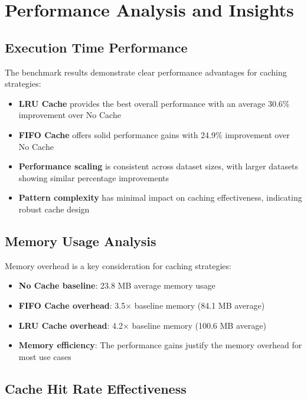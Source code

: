 \documentclass{article}
\begin{document}
\section{Performance Analysis and Insights}

\subsection{Execution Time Performance}

The benchmark results demonstrate clear performance advantages for caching strategies:

\begin{itemize}
    \item \textbf{LRU Cache} provides the best overall performance with an average 30.6\% improvement over No Cache
    \item \textbf{FIFO Cache} offers solid performance gains with 24.9\% improvement over No Cache
    \item \textbf{Performance scaling} is consistent across dataset sizes, with larger datasets showing similar percentage improvements
    \item \textbf{Pattern complexity} has minimal impact on caching effectiveness, indicating robust cache design
\end{itemize}

\subsection{Memory Usage Analysis}

Memory overhead is a key consideration for caching strategies:

\begin{itemize}
    \item \textbf{No Cache baseline}: 23.8 MB average memory usage
    \item \textbf{FIFO Cache overhead}: 3.5× baseline memory (84.1 MB average)
    \item \textbf{LRU Cache overhead}: 4.2× baseline memory (100.6 MB average)
    \item \textbf{Memory efficiency}: The performance gains justify the memory overhead for most use cases
\end{itemize}

\subsection{Cache Hit Rate Effectiveness}
\end{document}
